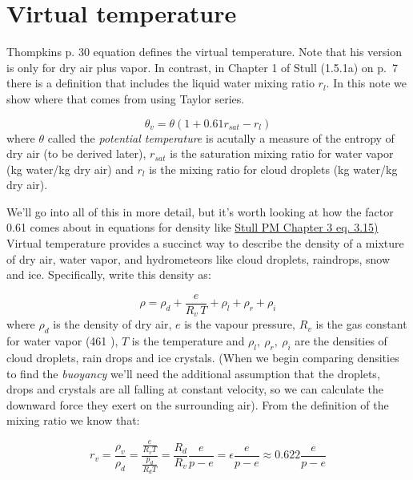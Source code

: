 \documentclass[12pt]{article}
\begin{document}
\pagestyle{first}


\section{Virtual temperature}
\label{sec:virtual-temperature}

Thompkins p. 30 equation defines the virtual temperature.  Note that his version
is only for dry air plus vapor.  In contrast, 
in Chapter 1 of  Stull (1.5.1a) on p.~7 there is a definition that includes
the liquid water mixing ratio $r_l$.  In this note we show where that comes from
using Taylor series.

\begin{equation*}
  \theta_v = \theta ( 1 + 0.61 r_{sat} - r_l )
\end{equation*}
where $\theta$ called the \textit{potential temperature} is acutally a measure
of the entropy of dry air (to be derived later), $r_{sat}$ is the saturation
mixing ratio for water vapor (kg water/kg dry air) and $r_l$ is the
mixing ratio for cloud droplets (kg water/kg dry air).

We'll go into all of this in more detail, but it's worth looking at how
the factor 0.61 comes about in equations for density like 
\href{https://www.eoas.ubc.ca/books/Practical_Meteorology/prmet102/Ch03-thermo-v102b.pdf}%
{Stull PM Chapter 3 eq. 3.15)}
Virtual temperature provides a succinct way to describe the density of a mixture of
dry air, water vapor, and hydrometeors like cloud droplets, raindrops, snow and ice.
Specifically, write this density as:

  \begin{equation}
    \label{eq:dalton}
    \rho = \rho_d + \frac{e}{R_v\, T} + \rho_l + \rho_r + \rho_i
  \end{equation}
where $\rho_d$ is the density of dry air, $e$ is the vapour pressure, $R_v$ is the
gas constant for water vapor (461 \jkgk), $T$ is the temperature and
$\rho_l,\  \rho_r,\ \rho_i$ are the densities of cloud droplets, rain drops and ice
crystals.  (When we begin comparing densities to find the \textit{buoyancy} we'll
need the additional assumption that the droplets, drops and crystals are all
falling at constant velocity, so we can calculate the downward force they exert
on the surrounding air). From the definition of the mixing ratio we know that:

\begin{equation}
  \label{eq:mixing}
  r_v = \frac{\rho_v}{\rho_d} = \frac{\frac{e}{R_v T}}{\frac{p_d}{R_d T}} = \frac{R_d}{R_v} \frac{e}{p-e}
      = \epsilon \frac{e}{p-e} \approx 0.622 \frac{e}{p-e}
\end{equation}
\end{document}
